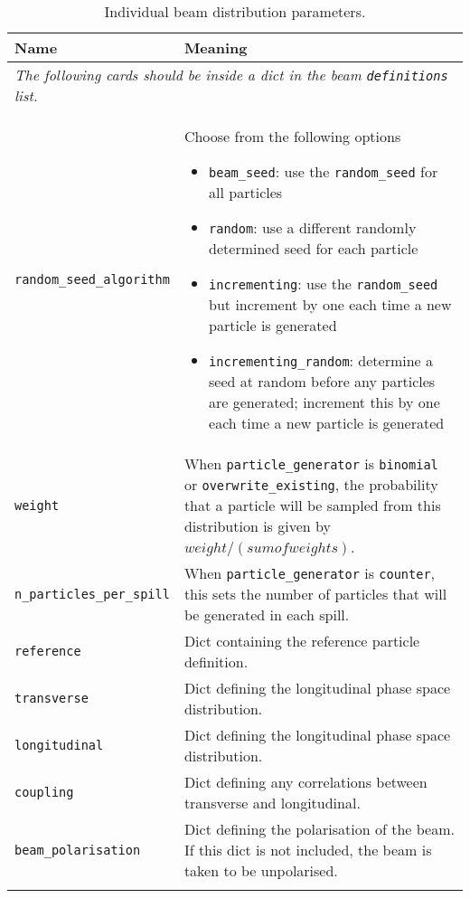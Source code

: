 \begin{table*}
\begin{center}
\caption{Individual beam distribution parameters.}
\begin{tabularx}{\linewidth}{lX}
Name & Meaning \\
\hline
\multicolumn{2}{l}{\emph{The following cards should be inside a dict in the beam \verb|definitions| list.}} \\
\hline
\verb|random_seed_algorithm| & Choose from the following options
                          \begin{itemize}
                            \setlength{\itemsep}{0mm}
                            \item \verb|beam_seed|: use the \verb|random_seed| for all particles
                            \item \verb|random|: use a different randomly determined seed for each particle
                            \item \verb|incrementing|: use the \verb|random_seed| but increment by one each time a new particle is generated
                            \item \verb|incrementing_random|: determine a seed at random before any particles are generated; increment this by one each time a new particle is generated
                          \end{itemize}\\
\verb|weight| & When \verb|particle_generator| is \verb|binomial| or \verb|overwrite_existing|, the probability that a particle will be sampled from this distribution is given by $weight/(sumofweights)$.\\
\verb|n_particles_per_spill| & When \verb|particle_generator| is \verb|counter|, this sets the number of particles that will be generated in each spill. \\
\verb|reference| & Dict containing the reference particle definition. \\
\verb|transverse| & Dict defining the longitudinal phase space distribution. \\
\verb|longitudinal| & Dict defining the longitudinal phase space distribution. \\
\verb|coupling| & Dict defining any correlations between transverse and longitudinal. \\
\verb|beam_polarisation| & Dict defining the polarisation of the beam. If this dict is not included, the beam is taken to be unpolarised. \\
\begin{makeimage} %
\end{makeimage} 
\end{tabularx}
\end{center}
\end{table*}


